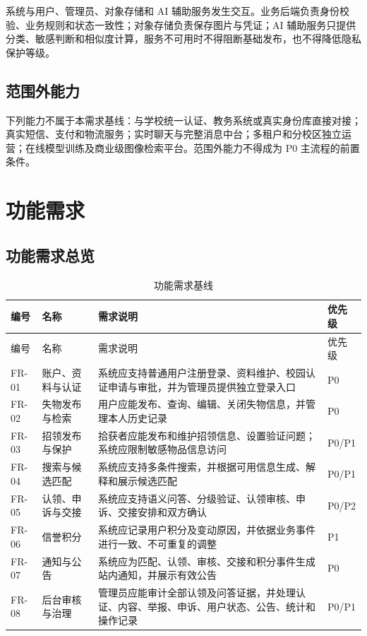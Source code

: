 系统与用户、管理员、对象存储和 AI 辅助服务发生交互。业务后端负责身份校验、业务规则和状态一致性；对象存储负责保存图片与凭证；AI 辅助服务只提供分类、敏感判断和相似度计算，服务不可用时不得阻断基础发布，也不得降低隐私保护等级。

\subsection{范围外能力}

下列能力不属于本需求基线：与学校统一认证、教务系统或真实身份库直接对接；真实短信、支付和物流服务；实时聊天与完整消息中台；多租户和分校区独立运营；在线模型训练及商业级图像检索平台。范围外能力不得成为 P0 主流程的前置条件。

\section{功能需求}

\subsection{功能需求总览}

\small
\begin{longtable}{L{1.4cm} L{3.0cm} L{6.8cm} L{2.4cm}}
  \caption{功能需求基线}\label{tab:functional}\\
  \toprule
  编号 & 名称 & 需求说明 & 优先级 \\
  \midrule
  \endfirsthead
  \toprule
  编号 & 名称 & 需求说明 & 优先级 \\
  \midrule
  \endhead
  FR-01 & 账户、资料与认证 & 系统应支持普通用户注册登录、资料维护、校园认证申请与审批，并为管理员提供独立登录入口 & P0 \\
  FR-02 & 失物发布与检索 & 用户应能发布、查询、编辑、关闭失物信息，并管理本人历史记录 & P0 \\
  FR-03 & 招领发布与保护 & 拾获者应能发布和维护招领信息、设置验证问题；系统应限制敏感物品信息访问 & P0/P1 \\
  FR-04 & 搜索与候选匹配 & 系统应支持多条件搜索，并根据可用信息生成、解释和展示候选匹配 & P0/P1 \\
  FR-05 & 认领、申诉与交接 & 系统应支持语义问答、分级验证、认领审核、申诉、交接安排和双方确认 & P0/P2 \\
  FR-06 & 信誉积分 & 系统应记录用户积分及变动原因，并依据业务事件进行一致、不可重复的调整 & P1 \\
  FR-07 & 通知与公告 & 系统应为匹配、认领、审核、交接和积分事件生成站内通知，并展示有效公告 & P0 \\
  FR-08 & 后台审核与治理 & 管理员应能审计全部认领及问答证据，并处理认证、内容、举报、申诉、用户状态、公告、统计和操作记录 & P0/P1 \\
  \bottomrule
\end{longtable}
\normalsize

